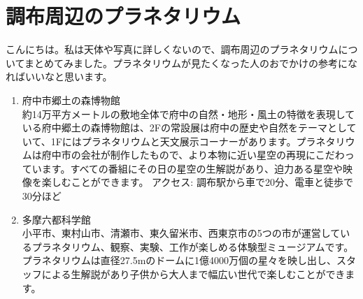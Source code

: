 \documentclass[../../super_nova_2023]{subfiles}
\begin{document}
\chapter{調布周辺のプラネタリウム}

こんにちは。私は天体や写真に詳しくないので、調布周辺のプラネタリウムについてまとめてみました。プラネタリウムが見たくなった人のおでかけの参考になればいいなと思います。

\begin{enumerate}
	\item {}
	      府中市郷土の森博物館\mbox{}\\約14万平方メートルの敷地全体で府中の自然・地形・風土の特徴を表現している府中郷土の森博物館は、2Fの常設展は府中の歴史や自然をテーマとしていて、1Fにはプラネタリウムと天文展示コーナーがあります。プラネタリウムは府中市の会社が制作したもので、より本物に近い星空の再現にこだわっています。すべての番組にその日の星空の生解説があり、迫力ある星空や映像を楽しむことができます。
	      \vspace{-\zw}アクセス: 調布駅から車で20分、電車と徒歩で30分ほど
	      \vspace{\zw}
	\item {}
	      多摩六都科学館\mbox{}\\小平市、東村山市、清瀬市、東久留米市、西東京市の5つの市が運営しているプラネタリウム、観察、実験、工作が楽しめる体験型ミュージアムです。プラネタリウムは直径27.5mのドームに1億4000万個の星々を映し出し、スタッフによる生解説があり子供から大人まで幅広い世代で楽しむことができます。
\end{enumerate}
\end{document}
